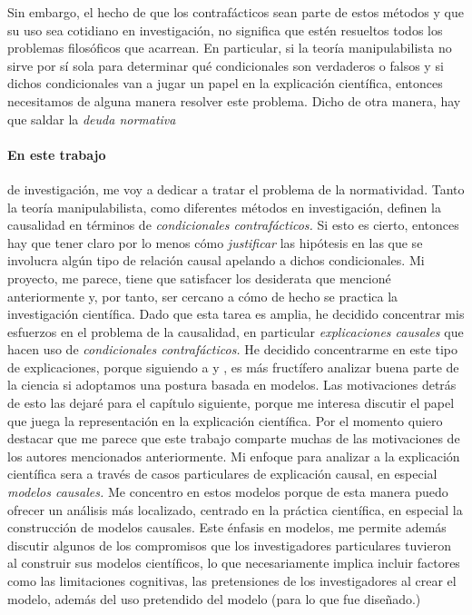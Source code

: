 Sin embargo, el hecho de que los contrafácticos sean parte
de estos métodos y que su uso sea cotidiano en
investigación, no significa que estén resueltos todos los
problemas filosóficos que acarrean. En particular, si la
teoría manipulabilista no sirve por sí sola para determinar
qué condicionales son verdaderos o falsos y si dichos
condicionales van a jugar un papel en la explicación
científica, entonces necesitamos de alguna manera resolver
este problema. Dicho de otra manera, hay que saldar la
\emph{deuda normativa}



\paragraph{En este trabajo} de investigación, me voy a
dedicar a tratar el problema de la normatividad. Tanto la teoría manipulabilista, como diferentes métodos en
investigación, definen la causalidad en términos de
\emph{condicionales contrafácticos.} Si esto es cierto, entonces hay que tener
claro por lo menos cómo \emph{justificar} las hipótesis en
las que se involucra algún tipo de relación causal
apelando a dichos condicionales. Mi proyecto, me parece,
tiene que satisfacer los desiderata que mencioné
anteriormente y, por tanto, ser cercano a cómo de hecho se
practica la investigación científica. Dado que esta tarea es
amplia, he decidido concentrar mis esfuerzos en el
problema de la causalidad, en particular \emph{explicaciones
causales} que hacen uso de \emph{condicionales
contrafácticos.} He decidido concentrarme en este tipo de
explicaciones, porque  siguiendo a \parencite{Suarez2024} y
\parencite{Ruyant2021}, es más fructífero analizar buena
parte de la ciencia si adoptamos una postura basada en
modelos. Las motivaciones detrás de esto las dejaré para el
capítulo siguiente, porque me interesa discutir el papel que
juega la representación en la explicación científica. Por el
momento quiero destacar que me parece que este trabajo
comparte muchas de las motivaciones de los autores
mencionados anteriormente. Mi enfoque para analizar a la
explicación científica sera a través de casos particulares
de explicación causal, en especial \emph{modelos causales.}
Me concentro en estos modelos porque de esta manera puedo
ofrecer un análisis más localizado, centrado en la práctica
científica, en especial la construcción de modelos
causales. Este énfasis en modelos, me permite además
discutir algunos de los compromisos que los investigadores
particulares tuvieron al construir sus modelos científicos,
lo que necesariamente implica incluir factores como las
limitaciones cognitivas, las pretensiones de los
investigadores al crear el modelo, además del uso
pretendido del modelo (para lo que fue diseñado.)

